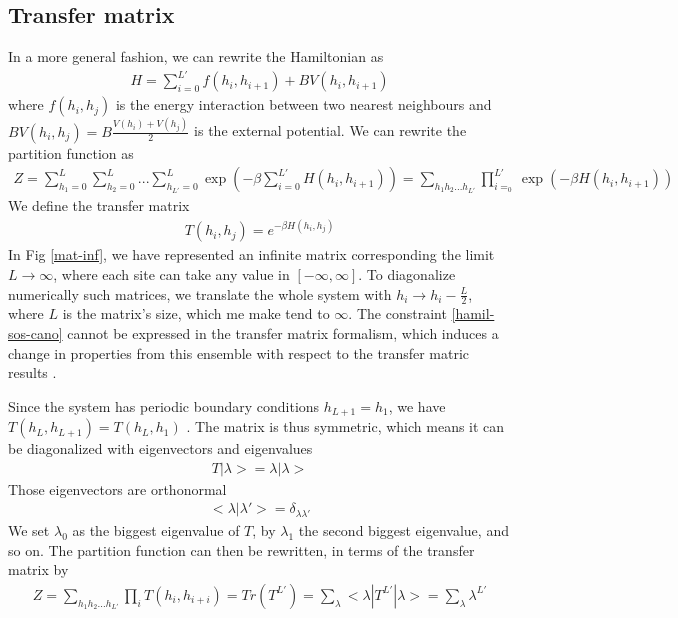 \subsection{Transfer matrix}


In a more general fashion, we can rewrite the Hamiltonian as
\begin{align*}
H = \sum_{i=0}^{L'} f(h_i,h_{i+1}) + B V(h_i,h_{i+1}) 
\end{align*}
where $f(h_i,h_j)$ is the energy interaction between two nearest neighbours and $B V(h_i,h_j)= B\frac{V(h_i)+V(h_j)}{2}$ is the external potential. We can rewrite the partition function as 
\begin{align}
Z = \sum_{h_1=0}^{L} \sum_{h_2=0}^{L}... \sum_{h_{L'}=0}^{L} \exp(- \beta \sum_{i=0}^{L'} H(h_i,h_{i+1}))
= \sum_{h_1 h_2 ... h_{L'}} \prod_{i=_0}^{L'} \exp(-\beta H(h_i,h_{i+1}))
\end{align}
We define the transfer matrix
\begin{align}
T(h_i,h_j) = e^{-\beta H(h_i,h_j)}
\label{matric-transfert}
\end{align}
In Fig \ref{mat-inf}, we have represented an infinite matrix corresponding the limit $L\to \infty$, where each site can take any value in $[-\infty,\infty]$. To diagonalize numerically such matrices, we translate the whole system with $h_i \to h_i - \frac{L}{2}$, where $L$ is the matrix's size, which me make tend to $\infty$.
The constraint \eqref{hamil-sos-cano} cannot be expressed in the transfer matrix formalism, which induces a change in properties from this ensemble with respect to the transfer matric results \cite{siegert_scaling_1993}.

Since the system has periodic boundary conditions $h_{L+1} = h_1$, we have $T(h_L,h_{L+1}) = T(h_L,h_1)$ \cite{pearce_exact_1989}. The matrix is thus symmetric, which means it can be diagonalized with eigenvectors and eigenvalues 
\begin{align}
T | \lambda> = \lambda |\lambda>
\end{align}
Those eigenvectors are orthonormal
\begin{align}
< \lambda | \lambda'> = \delta_{\lambda \lambda'}
\end{align}
We set $\lambda_0$ as the biggest eigenvalue of $T$, by $\lambda_1$ the second biggest eigenvalue, and so on. The partition function can then be rewritten, in terms of the transfer matrix \cite{abraham_transfer_1973} by
\begin{align}
Z = \sum_{h_1 h_2 ... h_{L'}} \prod_{i} T(h_i,h_{i+i}) = Tr( T^{L'}) = \sum_\lambda <\lambda | T^{L'} | \lambda> = \sum_\lambda \lambda^{L'}
\label{partition-trace-lambda}
\end{align}

